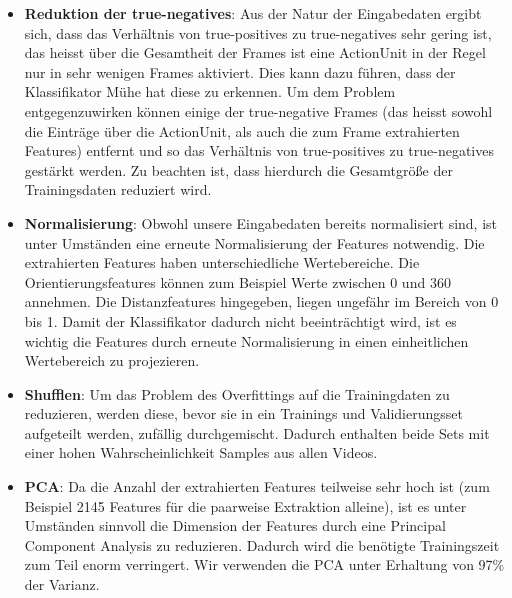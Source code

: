 \begin{itemize}
  \item \textbf{Reduktion der true-negatives}: Aus der Natur der Eingabedaten ergibt sich, dass das Verhältnis von true-positives zu true-negatives sehr gering ist, das heisst
        über die Gesamtheit der Frames ist eine ActionUnit in der Regel nur in sehr wenigen Frames aktiviert. Dies kann dazu führen, dass der Klassifikator Mühe hat diese zu erkennen.
        Um dem Problem entgegenzuwirken können einige der true-negative Frames (das heisst sowohl die Einträge über die ActionUnit, als auch die zum Frame extrahierten Features) entfernt
        und so das Verhältnis von true-positives zu true-negatives gestärkt werden. Zu beachten ist, dass hierdurch die Gesamtgröße der Trainingsdaten reduziert wird.

  \item \textbf{Normalisierung}: Obwohl unsere Eingabedaten bereits normalisiert sind, ist unter Umständen eine erneute Normalisierung der Features notwendig. Die extrahierten
        Features haben unterschiedliche Wertebereiche. Die Orientierungsfeatures können zum Beispiel Werte zwischen 0 und 360 annehmen. Die Distanzfeatures hingegeben, liegen
        ungefähr im Bereich von 0 bis 1. Damit der Klassifikator dadurch nicht beeinträchtigt wird, ist es wichtig die Features durch erneute Normalisierung in einen einheitlichen
        Wertebereich zu projezieren.

  \item \textbf{Shufflen}: Um das Problem des Overfittings auf die Trainingdaten zu reduzieren, werden diese, bevor sie in ein Trainings und Validierungsset aufgeteilt werden,
        zufällig durchgemischt. Dadurch enthalten beide Sets mit einer hohen Wahrscheinlichkeit Samples aus allen Videos.

  \item \textbf{PCA}: Da die Anzahl der extrahierten Features teilweise sehr hoch ist (zum Beispiel 2145 Features für die paarweise Extraktion alleine), ist es unter Umständen
        sinnvoll die Dimension der Features durch eine Principal Component Analysis zu reduzieren. Dadurch wird die benötigte Trainingszeit zum Teil enorm verringert. Wir
        verwenden die PCA unter Erhaltung von 97\% der Varianz.
\end{itemize}

